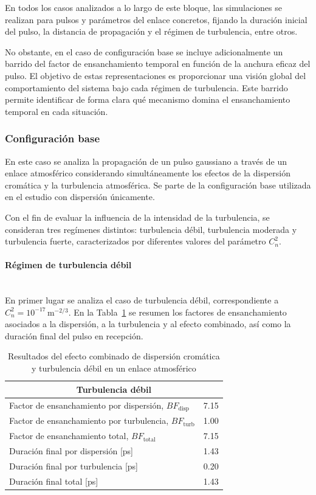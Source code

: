 En todos los casos analizados a lo largo de este bloque, las simulaciones se realizan para pulsos y parámetros del enlace concretos, fijando la duración inicial del pulso, la distancia de propagación y el régimen de turbulencia, entre otros.

No obstante, en el caso de configuración base se incluye adicionalmente un barrido del factor de ensanchamiento temporal en función de la anchura eficaz del pulso. El objetivo de estas representaciones es proporcionar una visión global del comportamiento del sistema bajo cada régimen de turbulencia. Este barrido permite identificar de forma clara qué mecanismo domina el ensanchamiento temporal en cada situación. 

\subsubsection*{Configuración base}
En este caso se analiza la propagación de un pulso gaussiano a través de un enlace atmosférico considerando simultáneamente los efectos de la dispersión cromática y la turbulencia atmosférica. Se parte de la configuración base utilizada en el estudio con dispersión únicamente.

Con el fin de evaluar la influencia de la intensidad de la turbulencia, se consideran tres regímenes distintos: turbulencia débil, turbulencia moderada y turbulencia fuerte, caracterizados por diferentes valores del parámetro $C_n^2$.

\paragraph{Régimen de turbulencia débil}\\
En primer lugar se analiza el caso de turbulencia débil, correspondiente a $C_n^2 = 10^{-17}\,\mathrm{m^{-2/3}}$. En la Tabla~\ref{tabla_atm_comb_debil} se resumen los factores de ensanchamiento asociados a la dispersión, a la turbulencia y al efecto combinado, así como la duración final del pulso en recepción.


\begin{table}[H]
\centering
\hspace*{-0.6cm}
\renewcommand{\arraystretch}{1.2}
\begin{tabular}{|l|c|}
\hline
\multicolumn{2}{|c|}{\textbf{Turbulencia débil}}\\
\hline
Factor de ensanchamiento por dispersión, $BF_{\mathrm{disp}}$ & 7.15 \\
Factor de ensanchamiento por turbulencia, $BF_{\mathrm{turb}}$ & 1.00 \\
Factor de ensanchamiento total, $BF_{\mathrm{total}}$ & 7.15 \\
\hline
Duración final por dispersión [ps] & 1.43 \\
Duración final por turbulencia [ps] & 0.20 \\
Duración final total [ps] & 1.43 \\
\hline
\end{tabular}
\caption{Resultados del efecto combinado de dispersión cromática y turbulencia débil en un enlace atmosférico}
\label{tabla_atm_comb_debil}
\end{table}

